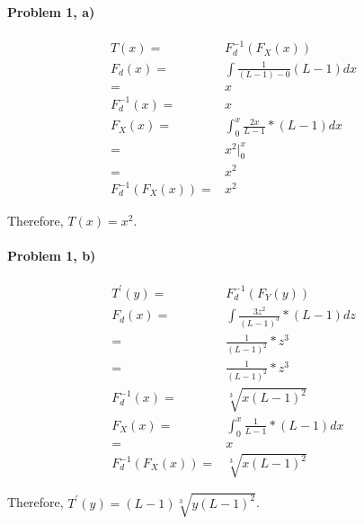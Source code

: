 \documentclass[11pt]{article}
\begin{document}
\MakeScribeTop


\paragraph{\noindent\textbf{\LARGE{Problem 1, a)}}}

\begin{equation*}
\begin{split}
    T(x) = & F^{-1}_d (F_X(x)) \\
    F_d(x) = & \int \frac{1}{(L-1)-0} (L-1) dx \\
            = & x \\
    F_d^{-1}(x) = & x \\
    F_X(x) = & \int_0^{x} \frac{2x}{L - 1} * (L-1) dx \\
            = & x^2 \rvert_0^{x} \\ 
            = & x^2 \\
    F^{-1}_d (F_X(x)) = & x^2
\end{split}
\end{equation*}
\begin{flushleft}
    Therefore, $T(x) = x^2$.
\end{flushleft} 


\paragraph{\noindent\textbf{\LARGE{Problem 1, b)}}}  
\begin{equation*}
\begin{split}
    T^\prime(y) = & F^{-1}_d (F_Y(y)) \\
    F_d(x)  = & \int \frac{3z^2}{(L-1)^3} * (L -1) dz \\
            = & \frac{1}{(L - 1)^2} *  z^3 \\ 
            = & \frac{1}{(L - 1)^2} *  z^3 \\
    F_d^{-1}(x) = & \sqrt[3]{x (L-1)^2 } \\
    F_X(x) = & \int_0^{x} \frac{1}{L-1} * (L-1) dx \\
            = & x \\
    F^{-1}_d (F_X(x)) = & \sqrt[3]{x (L-1)^2 } 
\end{split}
\end{equation*}
\begin{flushleft}
    Therefore, $T^\prime(y) =(L-1) \sqrt[3]{y (L-1)^2 }$.
\end{flushleft} 
        
\end{document}
